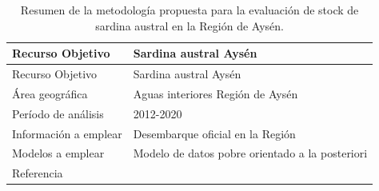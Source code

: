 \documentclass[
  spanish,
]{article}
\begin{document}
\begin{longtable}[]{@{}ll@{}}
\caption{\label{Tab3} Resumen de la metodología propuesta para la
evaluación de stock de sardina austral en la Región de
Aysén.}\tabularnewline
\toprule
\begin{minipage}[b]{0.30\columnwidth}\raggedright
Recurso Objetivo\strut
\end{minipage} & \begin{minipage}[b]{0.64\columnwidth}\raggedright
Sardina austral Aysén\strut
\end{minipage}\tabularnewline
\midrule
\endfirsthead
\toprule
\begin{minipage}[b]{0.30\columnwidth}\raggedright
Recurso Objetivo\strut
\end{minipage} & \begin{minipage}[b]{0.64\columnwidth}\raggedright
Sardina austral Aysén\strut
\end{minipage}\tabularnewline
\midrule
\endhead
\begin{minipage}[t]{0.30\columnwidth}\raggedright
Área geográfica\strut
\end{minipage} & \begin{minipage}[t]{0.64\columnwidth}\raggedright
Aguas interiores Región de Aysén\strut
\end{minipage}\tabularnewline
\begin{minipage}[t]{0.30\columnwidth}\raggedright
Período de análisis\strut
\end{minipage} & \begin{minipage}[t]{0.64\columnwidth}\raggedright
2012-2020\strut
\end{minipage}\tabularnewline
\begin{minipage}[t]{0.30\columnwidth}\raggedright
Información a emplear\strut
\end{minipage} & \begin{minipage}[t]{0.64\columnwidth}\raggedright
Desembarque oficial en la Región\strut
\end{minipage}\tabularnewline
\begin{minipage}[t]{0.30\columnwidth}\raggedright
Modelos a emplear\strut
\end{minipage} & \begin{minipage}[t]{0.64\columnwidth}\raggedright
Modelo de datos pobre orientado a la posteriori\strut
\end{minipage}\tabularnewline
\begin{minipage}[t]{0.30\columnwidth}\raggedright
Referencia\strut
\end{minipage} & \begin{minipage}[t]{0.64\columnwidth}\raggedright

\end{minipage}
\end{longtable}
\end{document}
